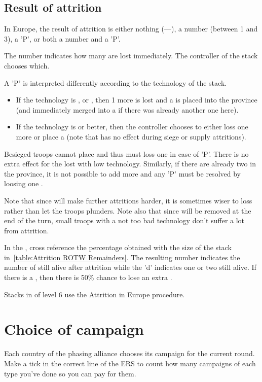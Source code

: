 \subsection{Result of attrition}
In Europe, the result of attrition is either nothing (---), a number
(between 1 and 3), a 'P', or both a number and a 'P'.

The number indicates how many \LD are lost immediately. The controller of the
stack chooses which.

A 'P' is interpreted differently according to the technology of the stack.
\begin{itemize}
\item If the technology is \TMED, \TREN or \TARQ, then 1 more \LD is lost and
  a \PILLAGE\facemoins is placed into the province (and immediately merged
  into a \PILLAGE\faceplus if there was already another one here).
\item If the technology is \TMUS or better, then the controller chooses to
  either loss one more \LD or place a \PILLAGE\facemoins (note that
   has no effect during siege or supply attritions).
\end{itemize}

Besieged troops cannot place \PILLAGE and thus must loss one \LD in case of
'P'. There is no extra effect for the lost \PILLAGE with low
technology. Similarly, if there are already two \PILLAGE\faceplus in the
province, it is not possible to add more and any 'P' must be resolved by
loosing one \LD.

Note that since \PILLAGE will make further attritions harder, it is sometimes
wiser to loss \LD rather than let the troops plunders. Note also that since
\PILLAGE\facemoins will be removed at the end of the turn, small troops with a
not too bad technology don't suffer a lot from attrition.

\smallskip

In the \ROTW, cross reference the percentage obtained with the size of the
stack in~\ref{table:Attrition ROTW Remainders}. The resulting number indicates
the number of \LD still alive after attrition while the 'd' indicates one or
two \LDE still alive. If there is a \textetoile, then there is 50\% chance to
lose an extra \LDE.

Stacks in \COL of level 6 use the Attrition in Europe procedure.


\section{Choice of campaign}
\label{chMilitary:Choice of campaign}
Each country of the phasing alliance chooses its campaign for the current
round. Make a tick in the correct line of the ERS to count how many campaigns
of each type you've done so you can pay for them.

